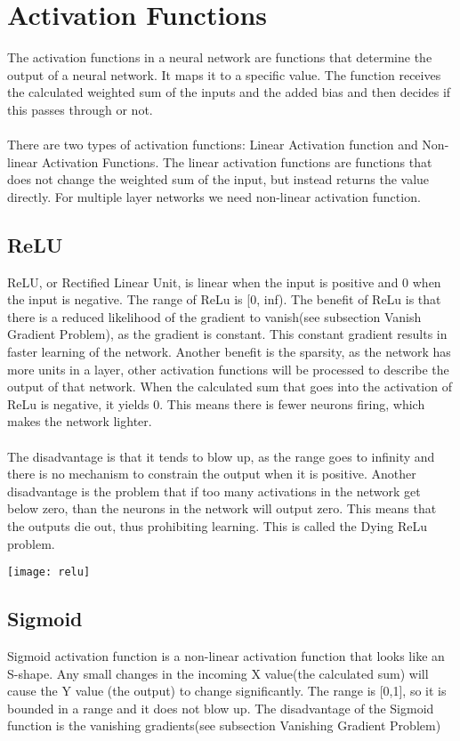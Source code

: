\section{Activation Functions}
The activation functions in a neural network are functions that determine the output of a neural network. It maps it to a specific value. The function receives the calculated weighted sum of the inputs and the added bias and then decides if this passes through or not. \\\\
There are two types of activation functions: Linear Activation function and Non-linear Activation Functions.
The linear activation functions are functions that does not change the weighted sum of the input, but instead returns the value directly. For multiple layer networks we need non-linear activation function.

\subsection{ReLU}
ReLU, or Rectified Linear Unit, is linear when the input is positive and 0 when the input is negative. The range of ReLu is [0, inf). The benefit of ReLu is that there is a reduced likelihood of the gradient to vanish(see subsection Vanish Gradient Problem), as the gradient is constant. This constant gradient results in faster learning of the network. Another benefit is the sparsity, as the network has more units in a layer, other activation functions will be processed to describe the output of that network. When the calculated sum that goes into the activation of ReLu is negative, it yields 0. This means there is fewer neurons firing, which makes the network lighter.\\\\
The disadvantage is that it tends to blow up, as the range goes to infinity and there is no mechanism to constrain the output when it is positive. Another disadvantage is the problem that if too many activations in the network get below zero, than the neurons in the network will output zero. This means that the outputs die out, thus prohibiting learning. This is called the Dying ReLu problem.

\texttt{[image: relu]}

\subsection{Sigmoid}
Sigmoid activation function is a non-linear activation function that looks like an S-shape. Any small changes in the incoming X value(the calculated sum) will cause the Y value (the output) to change significantly. The range is [0,1], so it is bounded in a range and it does not blow up. The disadvantage of the Sigmoid function is the vanishing gradients(see subsection Vanishing Gradient Problem)

